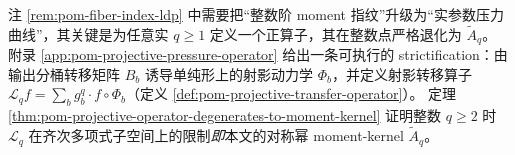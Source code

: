 \begin{remark}\label{rem:pom-moment-q-to-real-projective-operator}
注 \ref{rem:pom-fiber-index-ldp} 中需要把“整数阶 moment 指纹”升级为“实参数压力曲线”，其关键是为任意实 \(q\ge 1\) 定义一个正算子，其在整数点严格退化为 \(\widetilde A_q\)。
附录 \ref{app:pom-projective-pressure-operator} 给出一条可执行的 strictification：由输出分桶转移矩阵 \(B_b\) 诱导单纯形上的射影动力学 \(\Phi_b\)，并定义射影转移算子 \(\mathcal{L}_q f=\sum_b g_b^q\cdot f\!\circ\!\Phi_b\)（定义 \ref{def:pom-projective-transfer-operator}）。
定理 \ref{thm:pom-projective-operator-degenerates-to-moment-kernel} 证明整数 \(q\ge 2\) 时 \(\mathcal{L}_q\) 在齐次多项式子空间上的限制\emph{即}本文的对称幂 moment-kernel \(\widetilde A_q\)。
\end{remark}
